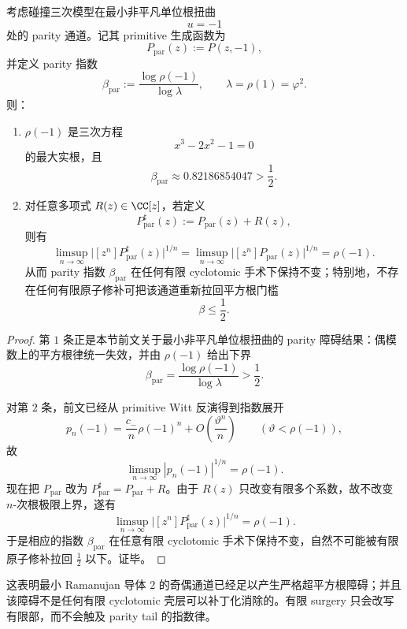 \begin{theorem}\label{thm:conclusion-conductor-two-ramanujan-obstruction-nonrepairable}
考虑碰撞三次模型在最小非平凡单位根扭曲
\[
u=-1
\]
处的 parity 通道。记其 primitive 生成函数为
\[
P_{\mathrm{par}}(z):=P(z,-1),
\]
并定义 parity 指数
\[
\beta_{\mathrm{par}}
:=
\frac{\log \rho(-1)}{\log\lambda},
\qquad
\lambda=\rho(1)=\varphi^2.
\]
则：
\begin{enumerate}
  \item \(\rho(-1)\) 是三次方程
  \[
  x^3-2x^2-1=0
  \]
  的最大实根，且
  \[
  \beta_{\mathrm{par}}\approx 0.82186854047>\frac12.
  \]
  \item 对任意多项式 \(R(z)\in \CC[z]\)，若定义
  \[
  P_{\mathrm{par}}^{\sharp}(z):=P_{\mathrm{par}}(z)+R(z),
  \]
  则有
  \[
  \limsup_{n\to\infty}\bigl|[z^n]P_{\mathrm{par}}^{\sharp}(z)\bigr|^{1/n}
  =
  \limsup_{n\to\infty}\bigl|[z^n]P_{\mathrm{par}}(z)\bigr|^{1/n}
  =
  \rho(-1).
  \]
  从而 parity 指数 \(\beta_{\mathrm{par}}\) 在任何有限 cyclotomic 手术下保持不变；特别地，不存在任何有限原子修补可把该通道重新拉回平方根门槛
  \[
  \beta\le \frac12.
  \]
\end{enumerate}
\end{theorem}
\begin{proof}
第 \(1\) 条正是本节前文关于最小非平凡单位根扭曲的 parity 障碍结果：偶模数上的平方根律统一失效，并由 \(\rho(-1)\) 给出下界
\[
\beta_{\mathrm{par}}=\frac{\log \rho(-1)}{\log\lambda}>\frac12.
\]

对第 \(2\) 条，前文已经从 primitive Witt 反演得到指数展开
\[
p_n(-1)=\frac{c_-}{n}\rho(-1)^n+O\!\left(\frac{\vartheta^n}{n}\right)
\qquad
(\vartheta<\rho(-1)),
\]
故
\[
\limsup_{n\to\infty}|p_n(-1)|^{1/n}=\rho(-1).
\]
现在把 \(P_{\mathrm{par}}\) 改为 \(P_{\mathrm{par}}^\sharp=P_{\mathrm{par}}+R\)。由于 \(R(z)\) 只改变有限多个系数，故不改变 \(n\)-次根极限上界，遂有
\[
\limsup_{n\to\infty}\bigl|[z^n]P_{\mathrm{par}}^{\sharp}(z)\bigr|^{1/n}
=
\rho(-1).
\]
于是相应的指数 \(\beta_{\mathrm{par}}\) 在任意有限 cyclotomic 手术下保持不变，自然不可能被有限原子修补拉回 \(\frac12\) 以下。证毕。
\end{proof}

\noindent
这表明最小 Ramanujan 导体 \(2\) 的奇偶通道已经足以产生严格超平方根障碍；并且该障碍不是任何有限 cyclotomic 壳层可以补丁化消除的。有限 surgery 只会改写有限部，而不会触及 parity tail 的指数律。
